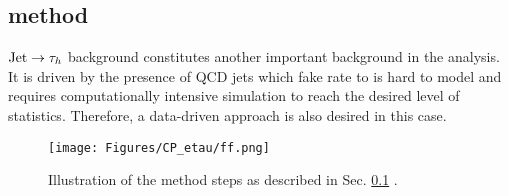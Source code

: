 \subsection{\ff method}\label{sec:ff}
$\text{Jet} \to \tau_h$ background constitutes another important background in the analysis. It is driven by the presence of QCD jets which fake rate to \tauh is hard to model and requires computationally intensive simulation to reach the desired level of statistics. Therefore, a data-driven approach is also desired in this case.

\begin{figure}[t!]
    \centering
    \texttt{[image: Figures/CP\_etau/ff.png]}
    \caption{Illustration of the \ff method steps as described in Sec. \ref{sec:ff} \cite{CMS:2018rmh}.}
    \label{fig:ff}
\end{figure}

